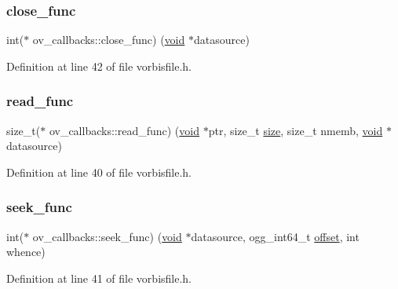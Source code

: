\subsubsection{\texorpdfstring{close\_func}{close\_func}}
{\footnotesize\ttfamily int($\ast$ ov\+\_\+callbacks\+::close\+\_\+func) (\mbox{\hyperlink{_s_d_l__opengles2__gl2ext_8h_ae5d8fa23ad07c48bb609509eae494c95}{void}} $\ast$datasource)}



Definition at line 42 of file vorbisfile.\+h.

\mbox{\label{structov__callbacks_a301b93b9f0436e5bde6dbdeb0edeae77}} 
\subsubsection{\texorpdfstring{read\_func}{read\_func}}
{\footnotesize\ttfamily size\+\_\+t($\ast$ ov\+\_\+callbacks\+::read\+\_\+func) (\mbox{\hyperlink{_s_d_l__opengles2__gl2ext_8h_ae5d8fa23ad07c48bb609509eae494c95}{void}} $\ast$ptr, size\+\_\+t \mbox{\hyperlink{_s_d_l__opengl__glext_8h_a3d1e3edfcf61ca2d831883e1afbad89e}{size}}, size\+\_\+t nmemb, \mbox{\hyperlink{_s_d_l__opengles2__gl2ext_8h_ae5d8fa23ad07c48bb609509eae494c95}{void}} $\ast$datasource)}



Definition at line 40 of file vorbisfile.\+h.

\mbox{\label{structov__callbacks_aa49d8079756c1c26e2ba9b974e463dfa}} 
\subsubsection{\texorpdfstring{seek\_func}{seek\_func}}
{\footnotesize\ttfamily int($\ast$ ov\+\_\+callbacks\+::seek\+\_\+func) (\mbox{\hyperlink{_s_d_l__opengles2__gl2ext_8h_ae5d8fa23ad07c48bb609509eae494c95}{void}} $\ast$datasource, ogg\+\_\+int64\+\_\+t \mbox{\hyperlink{_s_d_l__opengl__glext_8h_ac915cd848f42b26af51745f204a3b9af}{offset}}, int whence)}



Definition at line 41 of file vorbisfile.\+h.

\mbox{\label{structov__callbacks_ab078f3f386b7c58e9fab2ede904e0e36}} 
